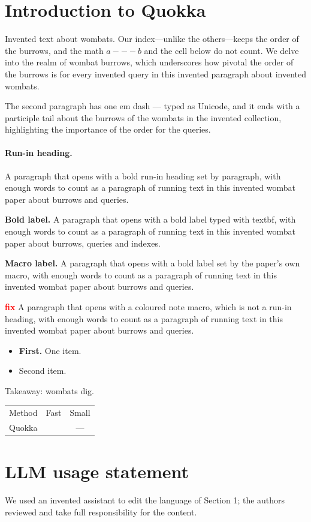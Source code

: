 \documentclass{article}
\newcommand{\cmark}{\ding{51}}
\newcommand{\myhead}[1]{\textbf{#1}}
\newcommand{\todo}[1]{\textcolor{red}{\textbf{#1}}}
\newcommand{\sys}{Quokka}
\begin{document}
\section{Introduction to \sys}
Invented text about wombats. Our index---unlike the others---keeps the order of the burrows, and the math
$a---b$ and the cell below do not count. We delve into the realm of wombat burrows, which underscores how
pivotal the order of the burrows is for every invented query in this invented paragraph about invented wombats.

The second paragraph has one em dash — typed as Unicode, and it ends with a participle tail about the
burrows of the wombats in the invented collection, highlighting the importance of the order for the queries.

\paragraph{Run-in heading.} A paragraph that opens with a bold run-in heading set by paragraph, with enough words
to count as a paragraph of running text in this invented wombat paper about burrows and queries.

\textbf{Bold label.} A paragraph that opens with a bold label typed with textbf, with enough words to count as a
paragraph of running text in this invented wombat paper about burrows, queries and indexes.

\myhead{Macro label.} A paragraph that opens with a bold label set by the paper's own macro, with enough words to
count as a paragraph of running text in this invented wombat paper about burrows and queries.

\todo{fix} A paragraph that opens with a coloured note macro, which is not a run-in heading, with enough words to
count as a paragraph of running text in this invented wombat paper about burrows and queries.
\begin{itemize}
\item \textbf{First.} One item.
\item Second item.
\end{itemize}
\begin{takeaway}
Takeaway: wombats dig.
\end{takeaway}
\begin{table}
\begin{tabular}{lcc}
Method & Fast & Small \\
\sys & \cmark & --- \\
\end{tabular}
\end{table}
\section*{LLM usage statement}
We used an invented assistant to edit the language of Section 1; the authors reviewed and take full
responsibility for the content.



\end{document}
